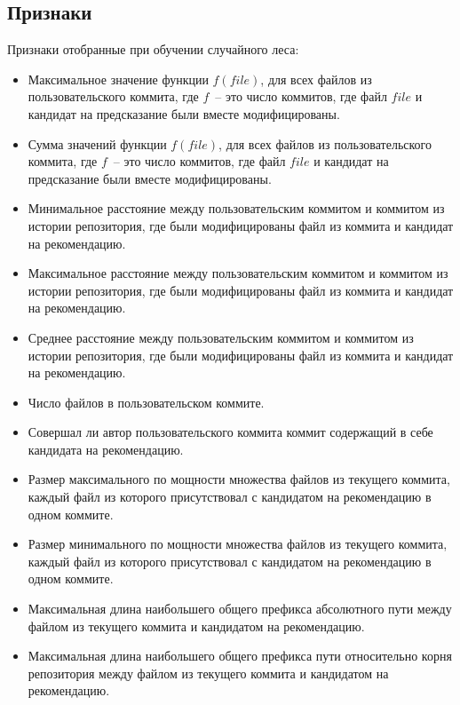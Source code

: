 \subsection{Признаки}
Признаки отобранные при обучении случайного леса:
\begin{itemize}
    \item Максимальное значение функции $f(file)$, для всех файлов из пользовательского коммита, где $f$~-- это число коммитов, где файл $file$ и кандидат на предсказание были вместе модифицированы.
    \item Сумма значений функции $f(file)$, для всех файлов из пользовательского коммита, где $f$~-- это число коммитов, где файл $file$ и кандидат на предсказание были вместе модифицированы.
    \item Минимальное расстояние между пользовательским коммитом и коммитом из истории репозитория, где были модифицированы файл из коммита и кандидат на рекомендацию.
    \item Максимальное расстояние между пользовательским коммитом и коммитом из истории репозитория, где были модифицированы файл из коммита и кандидат на рекомендацию.
    \item Среднее расстояние между пользовательским коммитом и коммитом из истории репозитория, где были модифицированы файл из коммита и кандидат на рекомендацию.
    \item Число файлов в пользовательском коммите.
    \item Совершал ли автор пользовательского коммита коммит содержащий в себе кандидата на рекомендацию.
    \item Размер максимального по мощности множества файлов из текущего коммита, каждый файл из которого присутствовал с кандидатом на рекомендацию в одном коммите.
    \item Размер минимального по мощности множества файлов из текущего коммита, каждый файл из которого присутствовал с кандидатом на рекомендацию в одном коммите.
    \item Максимальная длина наибольшего общего префикса абсолютного пути между файлом из текущего коммита и кандидатом на рекомендацию.
    \item Максимальная длина наибольшего общего префикса пути относительно корня репозитория между файлом из текущего коммита и кандидатом на рекомендацию.
\end{itemize}
